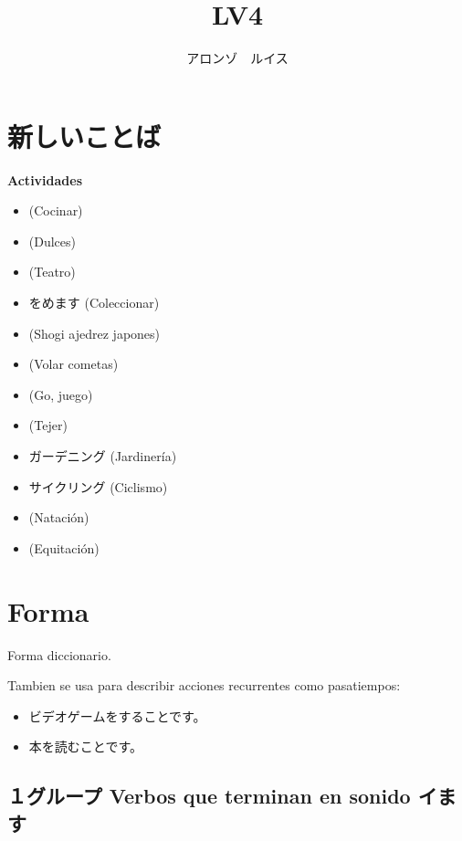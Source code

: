 \documentclass[a4paper,lualatex,ja=standard,base=10pt]{bxjsarticle}
\title{\ruby{第|０１|課}{だい||か} LV4}
\author{アロンゾ　ルイス}
\begin{document}
\setcounter{page}{1}

\maketitle{}
\thispagestyle{fancy}

\section{新しいことば }
\medskip

\textbf{Actividades}

\begin{itemize}
  \item {} (Cocinar)
  \item {} (Dulces)
  \item {} (Teatro)
  \item {}をめます (Coleccionar)
  \item {} (Shogi ajedrez japones)
  \item {} (Volar cometas)
  \item {} (Go, juego)
  \item {} (Tejer)
  \item ガーデニング (Jardinería)
  \item サイクリング (Ciclismo)
  \item {} (Natación)
  \item {} (Equitación)
\end{itemize}

\section{Forma }

Forma diccionario.

Tambien se usa para describir acciones recurrentes como pasatiempos:

\begin{itemize}
  \item ビデオゲームをすることです。
  \item 本を読むことです。
\end{itemize}


\subsection{１グループ Verbos que terminan en sonido イます}
\end{document}
